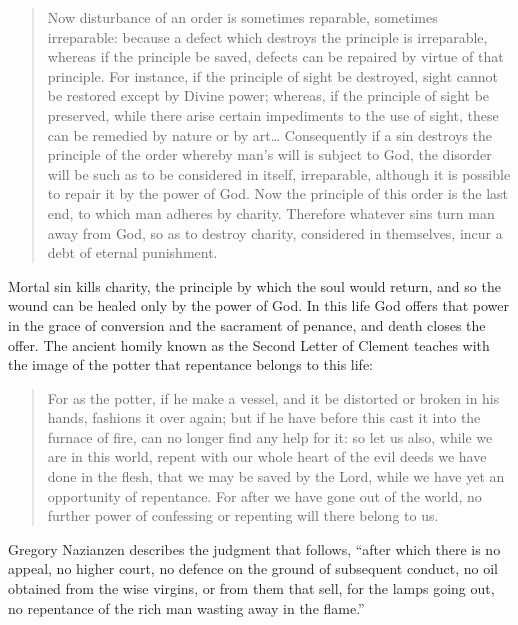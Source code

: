 \begin{quote}
Now disturbance of an order is sometimes reparable, sometimes irreparable: because a defect which destroys the principle is irreparable, whereas if the principle be saved, defects can be repaired by virtue of that principle. For instance, if the principle of sight be destroyed, sight cannot be restored except by Divine power; whereas, if the principle of sight be preserved, while there arise certain impediments to the use of sight, these can be remedied by nature or by art\ldots{} Consequently if a sin destroys the principle of the order whereby man's will is subject to God, the disorder will be such as to be considered in itself, irreparable, although it is possible to repair it by the power of God. Now the principle of this order is the last end, to which man adheres by charity. Therefore whatever sins turn man away from God, so as to destroy charity, considered in themselves, incur a debt of eternal punishment.
\end{quote}

\noindent Mortal sin kills charity, the principle by which the soul would return, and so the wound can be healed only by the power of God. In this life God offers that power in the grace of conversion and the sacrament of penance, and death closes the offer. The ancient homily known as the Second Letter of Clement teaches with the image of the potter that repentance belongs to this life:

\begin{quote}
For as the potter, if he make a vessel, and it be distorted or broken in his hands, fashions it over again; but if he have before this cast it into the furnace of fire, can no longer find any help for it: so let us also, while we are in this world, repent with our whole heart of the evil deeds we have done in the flesh, that we may be saved by the Lord, while we have yet an opportunity of repentance. For after we have gone out of the world, no further power of confessing or repenting will there belong to us.
\end{quote}

\noindent Gregory Nazianzen describes the judgment that follows, ``after which there is no appeal, no higher court, no defence on the ground of subsequent conduct, no oil obtained from the wise virgins, or from them that sell, for the lamps going out, no repentance of the rich man wasting away in the flame.''

